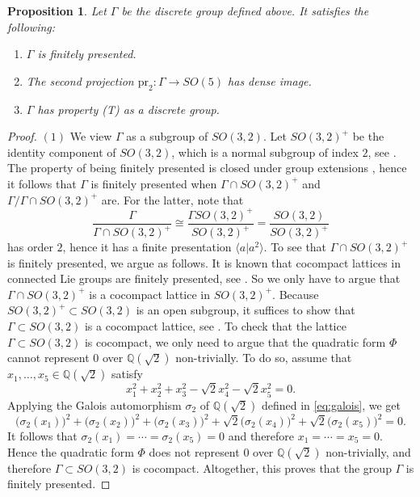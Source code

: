 \documentclass[11pt, letterpaper, oneside,reqno]{amsart}
\theoremstyle{plain}
\newtheorem{prop}[thm]{Proposition}
\theoremstyle{underline}
\theoremstyle{definition}
\theoremstyle{remark}
\begin{document}
	\begin{prop}
		Let $\Gamma$ be the discrete group defined above. It satisfies the following:
		\begin{enumerate}
			\item $\Gamma$ is finitely presented.
			\item The second projection $\text{pr}_{2}:\Gamma\rightarrow SO(5)$ has dense image.
			\item $\Gamma$ has property (T) as a discrete group.
		\end{enumerate}
	\end{prop}
	\begin{proof}
		$(1)$ We view $\Gamma$ as a subgroup of $SO(3,2)$. Let $SO(3,2)^{+}$ be the identity component of $SO(3,2)$, which is a normal subgroup of index $2$, see \cite[Prop.~1.145]{Knapp}. The property of being finitely presented is closed under group extensions \cite[Chapter~10, Cor.~2]{groups}, hence it follows that $\Gamma$ is finitely presented when $\Gamma\cap SO(3,2)^{+}$ and $\Gamma/\Gamma\cap SO(3,2)^{+}$ are. For the latter, note that
		\[
		\frac{\Gamma}{\Gamma\cap SO(3,2)^{+}}\cong\frac{\Gamma SO(3,2)^{+}}{SO(3,2)^{+}}=\frac{SO(3,2)}{SO(3,2)^{+}}
		\]
		has order $2$, hence it has a finite presentation $\langle a | a^{2}\rangle$. To see that $\Gamma\cap SO(3,2)^{+}$ is finitely presented, we argue as follows. It is known that cocompact lattices in connected Lie groups are finitely presented, see \cite[Thm.~6.15]{Rag}. So we only have to argue that $\Gamma\cap SO(3,2)^{+}$ is a cocompact lattice in $SO(3,2)^{+}$. Because $SO(3,2)^{+}\subset SO(3,2)$ is an open subgroup, it suffices to show that $\Gamma\subset SO(3,2)$ is a cocompact lattice, see \cite[\S~2.C.]{caprace}. To check that the lattice $\Gamma\subset SO(3,2)$ is cocompact, we only need to argue that the quadratic form $\Phi$ cannot represent $0$ over $\mathbb{Q}(\sqrt{2})$ non-trivially. To do so, assume that $x_1,\ldots,x_5\in\mathbb{Q}(\sqrt{2})$ satisfy
		\[
		x_1^{2}+x_2^{2}+x_3^{2}-\sqrt{2}x_4^{2}-\sqrt{2}x_5^{2}=0.
		\]
		Applying the Galois automorphism $\sigma_2$ of $\mathbb{Q}(\sqrt{2})$ defined in \eqref{eq:galois}, we get
		\[
		\big(\sigma_2(x_1)\big)^{2}+\big(\sigma_2(x_2)\big)^{2}+\big(\sigma_2(x_3)\big)^{2}+\sqrt{2}\big(\sigma_2(x_4)\big)^{2}+\sqrt{2}\big(\sigma_2(x_5)\big)^{2}=0.
		\]
		It follows that $\sigma_2(x_1)=\cdots=\sigma_2(x_5)=0$ and therefore $x_1=\cdots=x_5=0$. Hence the quadratic form $\Phi$ does not represent $0$ over $\mathbb{Q}(\sqrt{2})$ non-trivially, and therefore $\Gamma\subset SO(3,2)$ is cocompact. Altogether, this proves that the group $\Gamma$ is finitely presented.
		

\end{proof}
\end{document}
